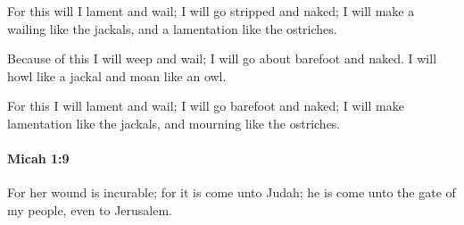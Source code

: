 			\begin{versebox}
					\item[BHS] 
					\item[LXX] 
					\item[ASV] For this will I lament and wail; I will go stripped and naked; I will make a wailing like the jackals, and a lamentation like the ostriches.
					\item[NIV] Because of this I will weep and wail; I will go about barefoot and naked. I will howl like a jackal and moan like an owl.
					\item[NRSV] For this I will lament and wail; I will go barefoot and naked; I will make lamentation like the jackals, and mourning like the ostriches.
			\end{versebox}

		\paragraph{Micah 1:9} %
			\label{MICAH-1-9}

			For her wound is incurable; for it is come unto Judah; he is come unto the gate of my people, even to Jerusalem.

